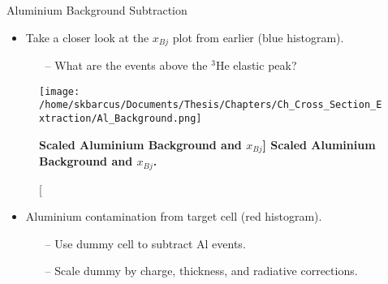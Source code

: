 \documentclass[10pt]{beamer}
\begin{document}
\begin{frame}[fragile]{Aluminium Background Subtraction}
	
	\begin{itemize}
		\item Take a closer look at the $x_{Bj}$ plot from earlier (\alert{blue} histogram).
			\begin{itemize}
				\item[--] What are the \alert{events above the $^3$He elastic peak}?
			\end{itemize}
	\end{itemize}
	
	\vspace{-2mm}
	\begin{figure}[!ht]
	\begin{center}
	\texttt{[image: /home/skbarcus/Documents/Thesis/Chapters/Ch\_Cross\_Section\_Extraction/Al\_Background.png]}
	\end{center}
	\caption[\bf{Scaled Aluminium Background and $x_{Bj}$}]{
	{\bf{Scaled Aluminium Background and $x_{Bj}$.}} }%
	\label{fig:al}
	\end{figure}
	
	\pause
	\vspace{-6mm}
	\begin{itemize}
		\item \alert{Aluminium contamination} from target cell (\alert{red} histogram).
			\begin{itemize}
				\item[--] Use \alert{dummy cell} to subtract Al events.
				\item[--] Scale dummy by \alert{charge}, \alert{thickness}, and \alert{radiative corrections}.
			\end{itemize}
	\end{itemize}
	
\end{frame}
\end{document}
